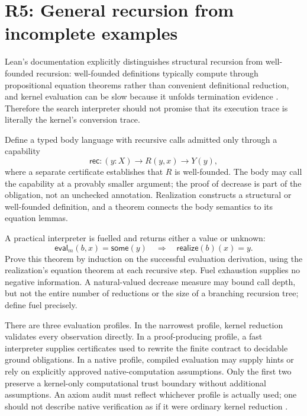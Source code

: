 \section{R5: General recursion from incomplete examples}\label{sec:r5}


Lean's documentation explicitly distinguishes structural recursion from
well-founded recursion: well-founded definitions typically compute through
propositional equation theorems rather than convenient definitional reduction,
and kernel evaluation can be slow because it unfolds termination evidence
\cite{leanrec}. Therefore the search interpreter should not promise that
its execution trace is literally the kernel's conversion trace.

Define a typed body language with recursive calls admitted only through a
capability
\[
 \mathsf{rec}:(y:X)\to R(y,x)\to Y(y),
\]
where a separate certificate establishes that $R$ is well-founded. The body
may call the capability at a provably smaller argument; the proof of decrease
is part of the obligation, not an unchecked annotation. Realization constructs
a structural or well-founded definition, and a theorem connects the body
semantics to its equation lemmas.

A practical interpreter is fuelled and returns either a value or unknown:
\[
 \mathsf{eval}_m(b,x)=\mathsf{some}(y)
 \quad\Longrightarrow\quad
 \mathsf{realize}(b)(x)=y.
 \tag{7}\label{eq:simulation}
\]
Prove this theorem by induction on the successful evaluation derivation,
using the realization's equation theorem at each recursive step. Fuel
exhaustion supplies no negative information. A natural-valued decrease measure
may bound call depth, but not the entire number of reductions or the size of
a branching recursion tree; define fuel precisely.

There are three evaluation profiles. In the narrowest profile, kernel
reduction validates every observation directly. In a proof-producing profile,
a fast interpreter supplies certificates used to rewrite the finite contract
to decidable ground obligations. In a native profile, compiled evaluation may
supply hints or rely on explicitly approved native-computation assumptions.
Only the first two preserve a kernel-only computational trust boundary without
additional assumptions. An axiom audit must reflect whichever profile is
actually used; one should not describe native verification as if it were
ordinary kernel reduction \cite{leanvalidation}.

